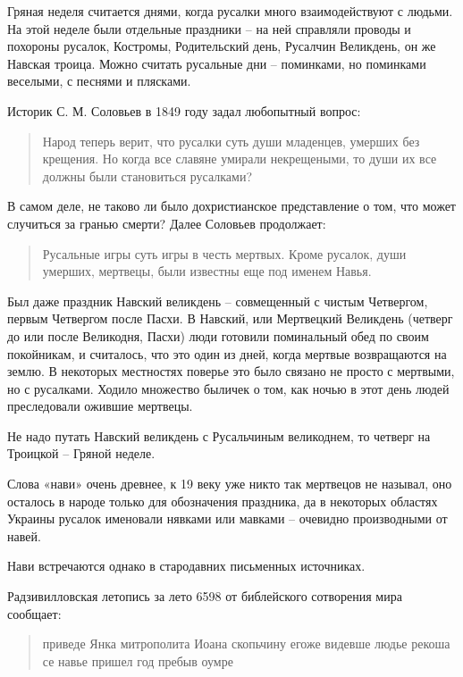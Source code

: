 \documentclass[a5paper,11pt,openany]{article}
\begin{document}
Гряная неделя считается днями, когда русалки много взаимодействуют с людьми. На этой неделе были отдельные праздники – на ней справляли проводы и похороны русалок, Костромы, Родительский день, Русалчин Великдень, он же Навская троица. Можно считать русальные дни – поминками, но поминками веселыми, с песнями и плясками.

   Историк С. М. Соловьев в 1849 году задал любопытный вопрос:

\begin{quotation}
\noindent Народ теперь верит, что русалки суть души младенцев, умерших без крещения. Но когда все славяне умирали некрещеными, то души их все должны были становиться русалками?
\end{quotation}

В самом деле, не таково ли было дохристианское представление о том, что может случиться за гранью смерти? Далее Соловьев продолжает:

\begin{quotation}
\noindent Русальные игры суть игры в честь мертвых. Кроме русалок, души умерших, мертвецы, были известны еще под именем Навья.
\end{quotation}

Был даже праздник Навский великдень – совмещенный с чистым Четвергом, первым Четвергом после Пасхи. В Навский, или Мертвецкий Великдень (четверг до или после Великодня, Пасхи) люди готовили поминальный обед по своим покойникам, и считалось, что это один из дней, когда мертвые возвращаются на землю. В некоторых местностях поверье это было связано не просто с мертвыми, но с русалками. Ходило множество быличек о том, как ночью в этот день людей преследовали ожившие мертвецы.

Не надо путать Навский великдень с Русальчиным великоднем, то четверг на Троицкой – Гряной неделе.

   Слова «нави» очень древнее, к 19 веку уже никто так мертвецов не называл, оно осталось в народе только для обозначения праздника, да в некоторых областях Украины русалок именовали нявками или мавками – очевидно производными от навей.

   Нави встречаются однако в стародавних письменных источниках.

   Радзивилловская летопись за лето 6598 от библейского сотворения мира сообщает:

\begin{quotation}
\noindent приведе Янка митрополита Иоана скопьчину егоже видевше людье рекоша се навье пришел год пребыв оумре
\end{quotation}
\end{document}
